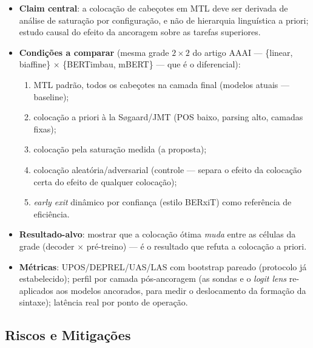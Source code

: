 \begin{itemize}
  \item \textbf{Claim central}: a colocação de cabeçotes em MTL deve ser derivada de análise
        de saturação por configuração, e não de hierarquia linguística a priori; estudo causal
        do efeito da ancoragem sobre as tarefas superiores.
  \item \textbf{Condições a comparar} (mesma grade $2 \times 2$ do artigo AAAI ---
        \{linear, biaffine\} $\times$ \{BERTimbau, mBERT\} --- que é o diferencial):
        \begin{enumerate}
          \item MTL padrão, todos os cabeçotes na camada final (modelos atuais --- baseline);
          \item colocação a priori à la Søgaard/JMT (POS baixo, parsing alto, camadas fixas);
          \item colocação pela saturação medida (a proposta);
          \item colocação aleatória/adversarial (controle --- separa o efeito da colocação
                certa do efeito de qualquer colocação);
          \item \textit{early exit} dinâmico por confiança (estilo BERxiT) como referência
                de eficiência.
        \end{enumerate}
  \item \textbf{Resultado-alvo}: mostrar que a colocação ótima \emph{muda} entre as células da
        grade (decoder $\times$ pré-treino) --- é o resultado que refuta a colocação a priori.
  \item \textbf{Métricas}: UPOS/DEPREL/UAS/LAS com bootstrap pareado (protocolo já
        estabelecido); perfil por camada pós-ancoragem (as sondas e o \textit{logit lens}
        re-aplicados aos modelos ancorados, para medir o deslocamento da formação da sintaxe);
        latência real por ponto de operação.
\end{itemize}

\subsection{Riscos e Mitigações}
\label{subsec:proposta_riscos}

